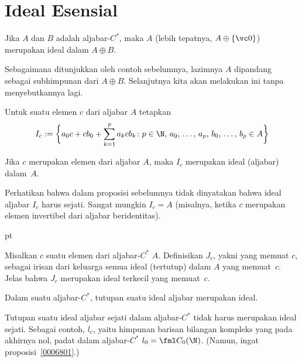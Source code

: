 \section{Ideal Esensial}
\begin{exam} Jika $A$ dan $B$ adalah aljabar-$C^*$, maka $A$ (lebih tepatnya, $A \oplus \{\vc
0\}$) merupakan ideal dalam $A \oplus B$.
\end{exam}

\begin{conv} Sebagaimana ditunjukkan oleh contoh sebelumnya, lazimnya $A$ dipandang sebagai
subhimpunan dari $A \oplus B$. Selanjutnya kita akan melakukan ini tanpa menyebutkannya lagi.
\end{conv}

\begin{notn} Untuk suatu elemen $c$ dari aljabar $A$
tetapkan
  \[ I_c := \biggl\{a_0c + cb_0 + \sum_{k=1}^p a_kcb_k \colon
   \text{$p \in \N$, $a_0$, \dots, $a_p$, $b_0$, \dots, $b_p \in A$}\biggr\} \]
\end{notn}

\begin{prop} Jika $c$ merupakan elemen dari aljabar $A$, maka $I_c$ merupakan ideal
(aljabar) dalam~$A$.
\end{prop}

Perhatikan bahwa dalam proposisi sebelumnya tidak dinyatakan bahwa ideal aljabar $I_c$
harus sejati. Sangat mungkin $I_c = A$ (misalnya, ketika $c$ merupakan
elemen invertibel dari aljabar beridentitas).

 pt

\begin{defn} Misalkan $c$ suatu elemen dari aljabar-$C^*$ $A$.
Definisikan $J_c$, yakni  yang memuat $c$, sebagai irisan dari
keluarga semua ideal (tertutup) dalam $A$ yang memuat~$c$. Jelas bahwa $J_c$ merupakan ideal terkecil
yang memuat~$c$.
\end{defn}

\begin{prop} Dalam suatu aljabar-$C^*$, tutupan suatu ideal aljabar merupakan ideal.
\end{prop}

\begin{exam} Tutupan suatu ideal aljabar sejati dalam aljabar-$C^*$ tidak harus merupakan
ideal sejati. Sebagai contoh, $l_c$, yaitu himpunan barisan bilangan kompleks yang
pada akhirnya nol, padat dalam aljabar-$C^*$ $l_0 = \fml C_0(\N)$. (Namun, ingat
proposisi~\ref{0006801}.)
\end{exam}

